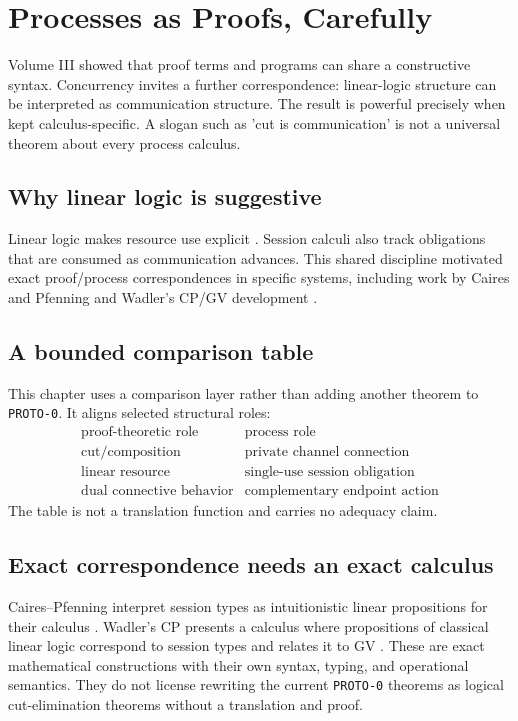 \chapter{Processes as Proofs, Carefully}

Volume III showed that proof terms and programs can share a constructive syntax. Concurrency invites a further correspondence: linear-logic structure can be interpreted as communication structure. The result is powerful precisely when kept calculus-specific. A slogan such as 'cut is communication' is not a universal theorem about every process calculus.

\section{Why linear logic is suggestive}
Linear logic makes resource use explicit \cite{girard1987}. Session calculi also track obligations that are consumed as communication advances. This shared discipline motivated exact proof/process correspondences in specific systems, including work by Caires and Pfenning \cite{cairespfenning2010} and Wadler's CP/GV development \cite{wadler2014}.



\section{A bounded comparison table}
This chapter uses a comparison layer rather than adding another theorem to \texttt{PROTO-0}. It aligns selected structural roles:
\[
\begin{array}{c|c}
\text{proof-theoretic role} & \text{process role}\\\hline
\text{cut/composition} & \text{private channel connection}\\
\text{linear resource} & \text{single-use session obligation}\\
\text{dual connective behavior} & \text{complementary endpoint action}
\end{array}
\]
The table is not a translation function and carries no adequacy claim.

\section{Exact correspondence needs an exact calculus}
Caires--Pfenning interpret session types as intuitionistic linear propositions for their calculus \cite{cairespfenning2010}. Wadler's CP presents a calculus where propositions of classical linear logic correspond to session types and relates it to GV \cite{wadler2014}. These are exact mathematical constructions with their own syntax, typing, and operational semantics. They do not license rewriting the current \texttt{PROTO-0} theorems as logical cut-elimination theorems without a translation and proof.

